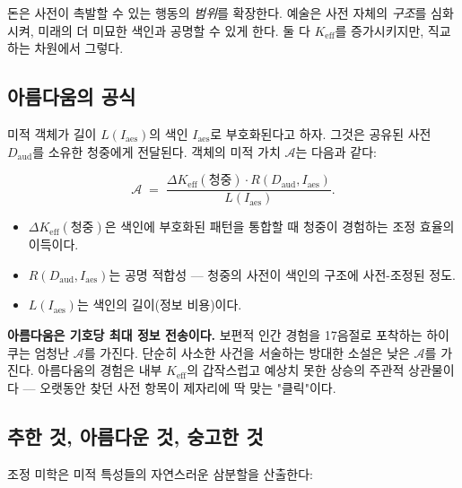 \documentclass[12pt,a4paper]{article}
\newcommand{\Keff}{K_{\mathrm{eff}}}
\begin{document}
	돈은 사전이 촉발할 수 있는 행동의 \emph{범위}를 확장한다. 예술은 사전 자체의 \emph{구조}를 심화시켜, 미래의 더 미묘한 색인과 공명할 수 있게 한다. 둘 다 \(K_{\mathrm{eff}}\)를 증가시키지만, 직교하는 차원에서 그렇다.
	
	\subsection{아름다움의 공식}
	
	미적 객체가 길이 \(L(I_{\mathrm{aes}})\)의 색인 \(I_{\mathrm{aes}}\)로 부호화된다고 하자. 그것은 공유된 사전 \(D_{\mathrm{aud}}\)를 소유한 청중에게 전달된다. 객체의 미적 가치 \(\mathcal{A}\)는 다음과 같다:
	
	\[
	\mathcal{A} \; = \; \frac{\Delta\Keff(\text{청중}) \cdot R(D_{\mathrm{aud}}, I_{\mathrm{aes}})}{L(I_{\mathrm{aes}})}.
	\]
	
	\begin{itemize}[leftmargin=*]
		\item \(\Delta\Keff(\text{청중})\)은 색인에 부호화된 패턴을 통합할 때 청중이 경험하는 조정 효율의 이득이다.
		\item \(R(D_{\mathrm{aud}}, I_{\mathrm{aes}})\)는 공명 적합성 — 청중의 사전이 색인의 구조에 사전-조정된 정도.
		\item \(L(I_{\mathrm{aes}})\)는 색인의 길이(정보 비용)이다.
	\end{itemize}
	
	\textbf{아름다움은 기호당 최대 정보 전송이다.} 보편적 인간 경험을 17음절로 포착하는 하이쿠는 엄청난 \(\mathcal{A}\)를 가진다. 단순히 사소한 사건을 서술하는 방대한 소설은 낮은 \(\mathcal{A}\)를 가진다. 아름다움의 경험은 내부 \(K_{\mathrm{eff}}\)의 갑작스럽고 예상치 못한 상승의 주관적 상관물이다 — 오랫동안 찾던 사전 항목이 제자리에 딱 맞는 "클릭"이다.
	
	\subsection{추한 것, 아름다운 것, 숭고한 것}
	
	조정 미학은 미적 특성들의 자연스러운 삼분할을 산출한다:
	
\end{document}
